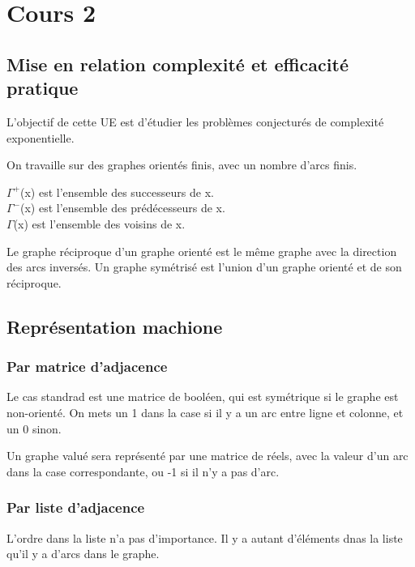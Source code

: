 \section{Cours 2}
\subsection{Mise en relation complexité et efficacité pratique}
L'objectif de cette UE est d'étudier les problèmes conjecturés de complexité exponentielle.

On travaille sur des graphes orientés finis, avec un nombre d'arcs finis.

$\Gamma^+$(x) est l'ensemble des successeurs de x.\\
$\Gamma^-$(x) est l'ensemble des prédécesseurs de x.\\
$\Gamma$(x) est l'ensemble des voisins de x.

Le graphe réciproque d'un graphe orienté est le même graphe avec la direction des arcs inversés.
Un graphe symétrisé est l'union d'un graphe orienté et de son réciproque.

\subsection{Représentation machione}
\subsubsection{Par matrice d'adjacence}
Le cas standrad est une matrice de booléen, qui est symétrique si le graphe est non-orienté.
On mets un 1 dans la case si il y a un arc entre ligne et colonne, et un 0 sinon.

Un graphe valué sera représenté par une matrice de réels, avec la valeur d'un arc dans la case correspondante, ou -1 si il n'y a pas d'arc.
\subsubsection{Par liste d'adjacence}
L'ordre dans la liste n'a pas d'importance. Il y a autant d'éléments dnas la liste qu'il y a d'arcs dans le graphe.

